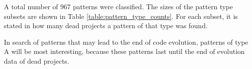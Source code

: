 A total number of 967 patterns were classified. The sizes of the pattern type
subsets are shown in Table \ref{table:pattern_type_counts}. For each subset, it
is stated in how many dead projects a pattern of that type was found.



\noindent
In search of patterns that may lead to the end of code evolution, patterns of
type A will be most interesting, because these patterns last until the end of
evolution data of dead projects.

\begin{comment}
- Factual results
- Tables and figures for clarification

This chapter presents and clarifies the results obtained during the research.
The focus should be on the factual results, not the interpretation or
discussion. Tables and graphics should be used to increase the clarity of the
results where applicable.
Have a look at the the results chapter in this example thesis on Paul’s
homepage\footnote{http://homepages.cwi.nl/~paulk/thesesMasterSoftwareEngineering/2006/ArnoldLankamp.pdf}.
\end{comment}
